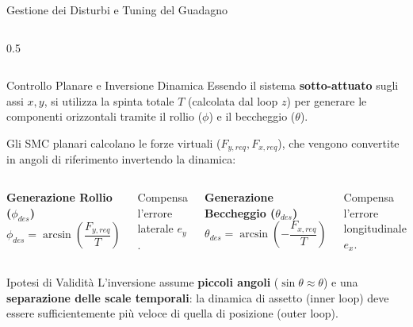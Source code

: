 \documentclass[aspectratio=169]{beamer} %
\begin{document}
\begin{frame}{Gestione dei Disturbi e Tuning del Guadagno}
\begin{columns}[c]
\begin{column}{0.5\textwidth}
            
            \vspace{0.2cm}
        \end{column}
    \end{columns}
\end{frame}

\begin{frame}{Controllo Planare e Inversione Dinamica}
    Essendo il sistema \textbf{sotto-attuato} sugli assi $x, y$, si utilizza la spinta totale $T$ (calcolata dal loop $z$) per generare le componenti orizzontali tramite il rollio ($\phi$) e il beccheggio ($\theta$).
    
    \vspace{0.2cm}
    Gli SMC planari calcolano le forze virtuali ($F_{y,req}, F_{x,req}$), che vengono convertite in angoli di riferimento invertendo la dinamica:
    
    \begin{columns}[t]
        \centering
        \textbf{Generazione Rollio ($\phi_{des}$)}
        \footnotesize
        \begin{equation}
            \phi_{des} = \arcsin\left( \frac{F_{y,req}}{T} \right)
        \end{equation}
        \raggedright
        Compensa l'errore laterale $e_y$.

        \centering
        \textbf{Generazione Beccheggio ($\theta_{des}$)}
        \footnotesize
        \begin{equation}
            \theta_{des} = \arcsin\left( - \frac{F_{x,req}}{T} \right)
        \end{equation}
        \raggedright
        Compensa l'errore longitudinale $e_x$.
    \end{columns}
    
    \vspace{0.3cm}
    \begin{alertblock}{Ipotesi di Validità}
    L'inversione assume \textbf{piccoli angoli} ($\sin\theta \approx \theta$) e una \textbf{separazione delle scale temporali}: la dinamica di assetto (inner loop) deve essere sufficientemente più veloce di quella di posizione (outer loop).
    \end{alertblock}
\end{frame}
\end{document}

